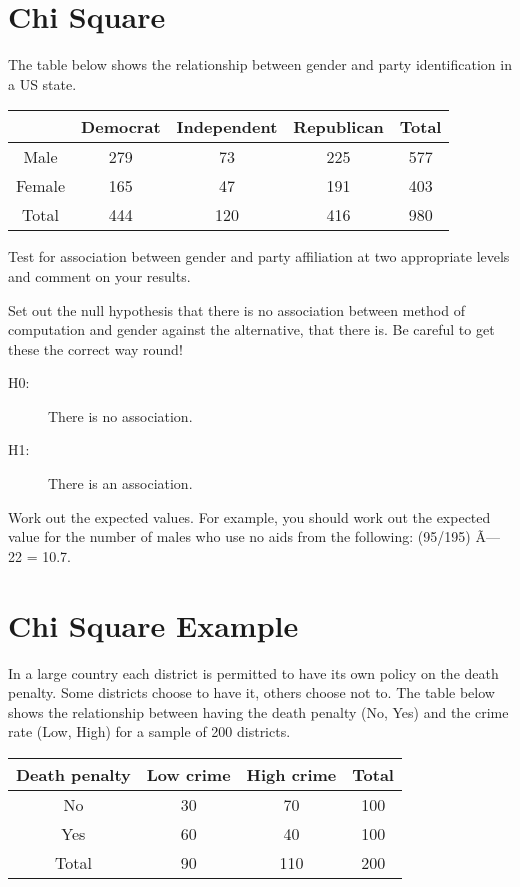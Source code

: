 \documentclass[]{report}
\begin{document}
\section{Chi Square}
The table below shows the relationship between gender and party identification in a US state.

\begin{tabular}{|c|c|c|c|c|}
& Democrat	&Independent&	Republican	&Total \\ \hline
Male&	279	&73&	225	& 577 \\ \hline
Female&	165	&47	&191&	403 \\ \hline
Total&	444	&120&	416 &	980 \\ \hline
\end{tabular} 



Test for association between gender and party affiliation at two appropriate levels
and comment on your results.

Set out the null hypothesis that there is no association between method of computation
and gender against the alternative, that there is. Be careful to get these the correct way
round!

\begin{description}
\item[H0:] There is no association.
\item[H1:] There is an association.
\end{description}

Work out the expected values. For example, you should work out the expected value for
the number of males who use no aids from the following: (95/195) Ã— 22 = 10.7.


\section{Chi Square Example}

In a large country each district is permitted to have its own policy on
the death penalty. Some districts choose to have it, others choose not
to. The table below shows the relationship between having the death
penalty (No, Yes) and the crime rate (Low, High) for a sample of 200
districts.

\begin{center}
\begin{tabular}{|c|c c|c|}
	\hline
	Death
	penalty & Low crime & High crime & Total \\ \hline
	No & 30 & 70 & 100\\ \hline
	Yes & 60 & 40 & 100 \\ \hline
	Total & 90 & 110 & 200 \\
	\hline
\end{tabular}
\end{center}
\end{document}
